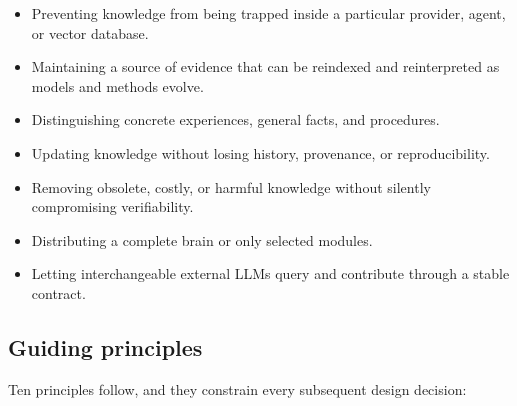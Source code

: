 \documentclass[11pt,a4paper]{article}
\begin{document}
\begin{itemize}[leftmargin=1.4em]
  \item Preventing knowledge from being trapped inside a particular provider,
  agent, or vector database.
  \item Maintaining a source of evidence that can be reindexed and reinterpreted
as models and methods evolve.
  \item Distinguishing concrete experiences, general facts, and procedures.
  \item Updating knowledge without losing history, provenance, or
  reproducibility.
  \item Removing obsolete, costly, or harmful knowledge without silently
compromising verifiability.
  \item Distributing a complete brain or only selected modules.
  \item Letting interchangeable external LLMs query and contribute through a
stable contract.
\end{itemize}

\subsection{Guiding principles}

Ten principles follow, and they constrain every subsequent design decision:
\end{document}
